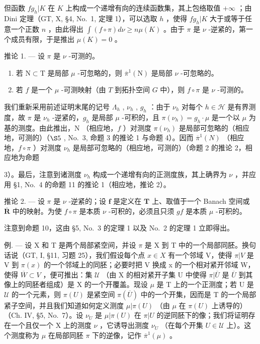 但函数 \(fg_h|K\) 在 \(K\) 上构成一个递增有向的连续函数集，其上包络取值 \(+\infty\) ；由 Dini 定理（GT, X, §4, No.~1, 定理 1），可以选取 \(h\) ，使得 \(fg_h|K\) 大于或等于任意一个正数 \(n\) ，由此得出 \(\int(f \circ \pi) d\nu \geqslant n \mu(K)\) 。由于 \(\pi\) 是 \(\nu\) -逆紧的，第一个成员有限，于是推出 \(\mu(K) = 0\) 。

推论 1. --- 设 \(\pi\) 是 \(\nu\) -可测的。

\begin{enumerate}
\def\labelenumi{\alph{enumi})}
\item
  若 \(\mathrm{N}\subset \mathrm{T}\) 是局部 \(\mu\) -可忽略的，则 \(\overline{\pi}^{1}(\mathrm{N})\) 是局部 \(\nu\) -可忽略的。
\item
  若 \(f\) 是一个 \(\mu\) -可测映射（由 \(T\) 到拓扑空间 \(G\) 中），则 \(f \circ \pi\) 是 \(\nu\) -可测的。
\end{enumerate}

我们重新采用前述证明末尾的记号 \(\Lambda_h\) , \(\nu_h\) , \(g_h\) ：由于 \(\nu_h\) 对每个 \(h \in \mathcal{H}\) 是有界测度，故 \(\pi\) 是 \(\nu_h\) -逆紧的，\(g_h\) 是局部 \(\mu\) -可积的，且 \(\pi(\nu_h) = g_h \cdot \mu\) 是一个以 \(\mu\) 为基的测度。由此推出，N （相应地，\(f\) ）对测度 \(\pi(\nu_h)\) 是局部可忽略的（相应地，可测的）（\(\S 5\) , No.~3, 命题 3 的推论 1 与命题 4）。因而 \(\overline{\pi}^1(N)\) （相应地，\(f \circ \pi\) ）对测度 \(\nu_h\) 是局部可忽略的（相应地，可测的）（命题 2 的推论 2，相应地为命题

3）。最后，注意到诸测度 \(\nu_{h}\) 构成一个递增有向的正测度族，其上确界为 \(\nu\) ，并应用 §1, No.~4 的命题 11 的推论 1（相应地，推论 2）。

推论 2. --- 设 \(\pi\) 是 \(\nu\) -逆紧的；设 \(\mathbf{f}\) 是定义在 \(\mathbf{T}\) 上、取值于一个 Banach 空间或 \(\overline{\mathbf{R}}\) 中的映射。为使 \(f \circ \pi\) 是本质 \(\nu\) -可积的，必须且只须 \(gf\) 是本质 \(\mu\) -可积的。

注意到命题 10，这由 §5, No.~3 的定理 1 以及 No.~2 的定理 1 立即得出。

例. --- 设 X 和 T 是两个局部紧空间，并设 \(\pi\) 是 X 到 T 中的一个局部同胚。换句话说（GT, I, §11, 习题 25），我们假设每个点 \(x \in X\) 有一个邻域 V，使得 \(\pi|V\) 是 V 到 \(\pi(x)\) 的一个邻域上的同胚；必要时把 V 换成 x 的一个相对紧开邻域 W，使得 \(\overline{W} \subset V\) ，便可推出：集 \(\mathcal{U}\) （由 X 的相对紧开子集 U 中使得 \(\pi|\overline{U}\) 是 \(\overline{U}\) 到其像上的同胚者组成）是 X 的一个开覆盖。现设 \(\mu\) 是 T 上的一个正测度；若 U 是 \(\mathcal{U}\) 的一个元素，则 \(\pi(U)\) 是紧空间 \(\pi(\overline{U})\) 中的一个开集，因而是 T 的一个局部紧子空间，并且我们知道如何定义测度 \(\mu|\pi(U)\) （由 \(\mu\) 在 \(\pi(U)\) 上诱导的）（Ch. IV, §5, No.~7）。设 \(\nu_{U}\) 是 \(\mu|\pi(U)\) 在 \(\pi|U\) 的逆同胚下的像；我们将证明存在一个且仅一个 X 上的测度 \(\nu\) ，它诱导出测度 \(\nu_{U}\) （在每个开集 \(U \in \mathcal{U}\) 上）。这个测度称为 \(\mu\) 在局部同胚 \(\pi\) 下的逆像，记作 \(\overline{\pi}^{1}(\mu)\) 。

